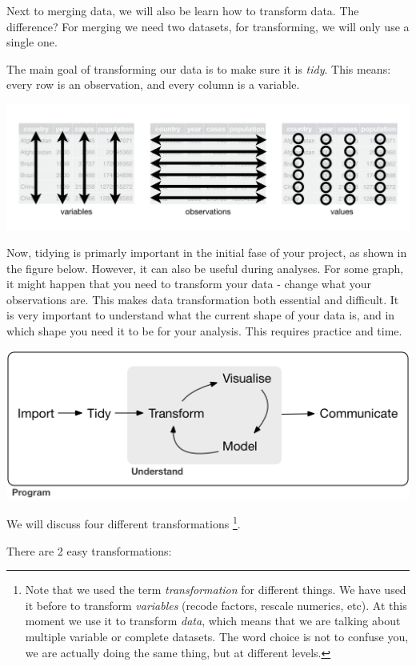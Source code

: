 \documentclass[]{tufte-book}
\begin{document}
Next to merging data, we will also be learn how to transform data. The difference? For merging we need two datasets, for transforming, we will only use a single one.

The main goal of transforming our data is to make sure it is \emph{tidy}. This means: every row is an observation, and every column is a variable.

\includegraphics[width=1\linewidth]{images/tidydata}

Now, tidying is primarly important in the initial fase of your project, as shown in the figure below. However, it can also be useful during analyses. For some graph, it might happen that you need to transform your data - change what your observations are. This makes data transformation both essential and difficult. It is very important to understand what the current shape of your data is, and in which shape you need it to be for your analysis. This requires practice and time.

\includegraphics[width=1\linewidth]{images/tidyverse}

We will discuss four different transformations \footnote{Note that we used the term \emph{transformation} for different things. We have used it before to transform \emph{variables} (recode factors, rescale numerics, etc). At this moment we use it to transform \emph{data}, which means that we are talking about multiple variable or complete datasets. The word choice is not to confuse you, we are actually doing the same thing, but at different levels.}.

There are 2 easy transformations:
\end{document}
